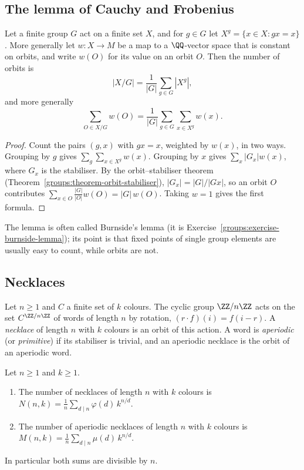 \subsection{The lemma of Cauchy and Frobenius}\label{combinatorics:subsection-burnside}

\begin{lemma}\label{combinatorics:lemma-burnside}
Let a finite group $G$ act on a finite set $X$, and for $g \in G$ let $X^g = \{x \in X : gx = x\}$. More generally let $w \colon X \to M$ be a map to a $\QQ$-vector space that is constant on orbits,
and write $w(O)$ for its value on an orbit $O$. Then the number of orbits is
\[
|X/G| = \frac{1}{|G|}\sum_{g \in G}|X^g|,
\]
and more generally
\[
\sum_{O \in X/G}w(O) = \frac{1}{|G|}\sum_{g \in G}\sum_{x \in X^g}w(x).
\]
\end{lemma}

\begin{proof}
Count the pairs $(g, x)$ with $gx = x$, weighted by $w(x)$, in two ways. Grouping by $g$ gives $\sum_g\sum_{x \in X^g}w(x)$. Grouping by $x$ gives $\sum_x|G_x|w(x)$, where $G_x$ is the stabiliser.
By the orbit--stabiliser theorem (Theorem~\ref{groups:theorem-orbit-stabiliser}), $|G_x| = |G|/|Gx|$, so an orbit $O$ contributes $\sum_{x \in O}\frac{|G|}{|O|}w(O) = |G|\,w(O)$. Taking $w = 1$ gives the
first formula.
\end{proof}

The lemma is often called Burnside's lemma (it is Exercise~\ref{groups:exercise-burnside-lemma}); its point is that fixed points of single group elements are usually easy to count, while orbits are not.

\subsection{Necklaces}\label{combinatorics:subsection-necklaces}

\begin{definition}\label{combinatorics:definition-necklace}
Let $n \geq 1$ and $C$ a finite set of $k$ colours. The cyclic group $\ZZ/n\ZZ$ acts on the set $C^{\ZZ/n\ZZ}$ of words of length $n$ by rotation, $(r \cdot f)(i) = f(i - r)$. A \emph{necklace} of length
$n$ with $k$ colours is an orbit of this action. A word is \emph{aperiodic} (or \emph{primitive}) if its stabiliser is trivial, and an aperiodic necklace is the orbit of an aperiodic word.
\end{definition}

\begin{theorem}[Necklaces]\label{combinatorics:theorem-necklaces}
Let $n \geq 1$ and $k \geq 1$.
\begin{enumerate}
\item The number of necklaces of length $n$ with $k$ colours is $\displaystyle N(n, k) = \frac{1}{n}\sum_{d \mid n}\varphi(d)\,k^{n/d}$.
\item The number of aperiodic necklaces of length $n$ with $k$ colours is $\displaystyle M(n, k) = \frac{1}{n}\sum_{d \mid n}\mu(d)\,k^{n/d}$.
\end{enumerate}
In particular both sums are divisible by $n$.
\end{theorem}

